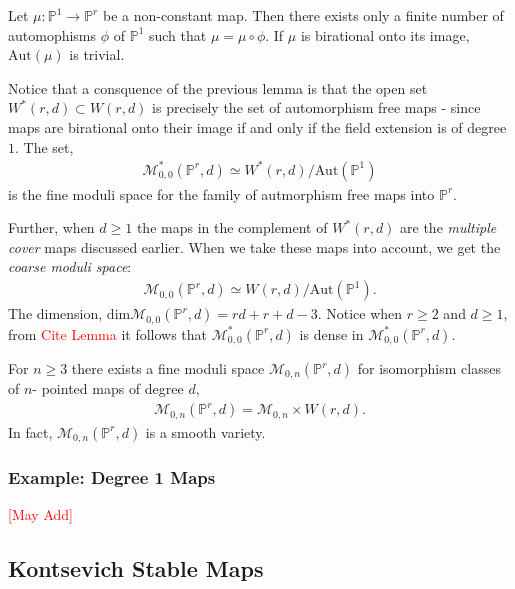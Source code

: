 \begin{lemma}
    Let $\mu : \mathbb{P}^{1} \to \mathbb{P}^{r}$ be a non-constant map. 
    Then there exists only a finite number of automophisms $\phi$ of $\mathbb{P}^{1}$ such that $\mu = \mu \circ \phi$.
    If $\mu$ is birational onto its image, $\text{Aut}(\mu)$ is trivial.
\end{lemma}

Notice that a consquence of the previous lemma is that the open set $W^{*}(r,d) \subset W(r,d)$ is precisely the set of automorphism free maps - since maps are birational onto their image if and only if the field extension is of degree $1$. 
The set, 
\begin{align*}
    \mathcal{M}^{*}_{0,0}(\mathbb{P}^{r},d) \simeq W^{*}(r,d)/\text{Aut}(\mathbb{P}^{1})
\end{align*}
is the fine moduli space for the family of autmorphism free maps into $\mathbb{P}^{r}$.
\par Further, when $d \geq 1$ the maps in the complement of $W^{*}(r,d)$ are the \textit{multiple cover} maps discussed earlier. 
When we take these maps into account, we get the \textit{coarse moduli space}:
\begin{align*}
    \mathcal{M}_{0,0}(\mathbb{P}^{r},d) \simeq W(r,d)/\text{Aut}(\mathbb{P}^{1}).
\end{align*}
The dimension, $\text{dim}\mathcal{M}_{0,0}(\mathbb{P}^{r},d) = rd + r + d -3$.
Notice when $r\geq 2$ and $d \geq 1$, from \textcolor{red}{Cite Lemma} it follows that $\mathcal{M}^{*}_{0,0}(\mathbb{P}^{r},d)$ is dense in $\mathcal{M}^{*}_{0,0}(\mathbb{P}^{r},d)$.


\begin{proposition}
    For $n \geq 3$ there exists a fine moduli space $\mathcal{M}_{0,n}(\mathbb{P}^{r},d)$ for isomorphism classes of $n$- pointed maps of degree $d$,
    \begin{align*}
        \mathcal{M}_{0,n}(\mathbb{P}^{r},d) = \mathcal{M}_{0,n} \times W(r,d).
    \end{align*}
    In fact, $\mathcal{M}_{0,n}(\mathbb{P}^{r},d)$ is a smooth variety.
\end{proposition}

\subsubsection{Example: Degree 1 Maps}
\textcolor{red}{[May Add]}
\subsection{Kontsevich Stable Maps}

